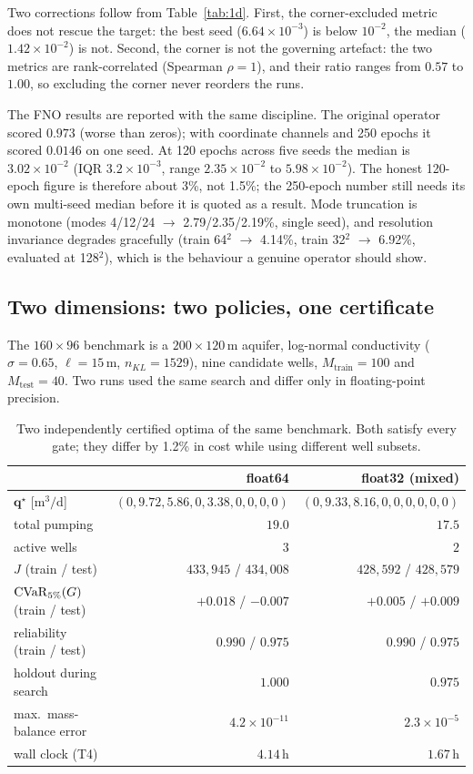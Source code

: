 Two corrections follow from Table~\ref{tab:1d}. First, the corner-excluded
metric does not rescue the target: the best seed
($6.64\times10^{-3}$) is below $10^{-2}$, the median ($1.42\times10^{-2}$) is
not. Second, the corner is not the governing artefact: the two metrics are
rank-correlated (Spearman $\rho=1$), and their ratio ranges from $0.57$ to
$1.00$, so excluding the corner never reorders the runs.

The FNO results are reported with the same discipline. The original operator
scored $0.973$ (worse than zeros); with coordinate channels and 250 epochs it
scored $0.0146$ on one seed. At 120 epochs across five seeds the median is
$3.02\times10^{-2}$ (IQR $3.2\times10^{-3}$, range $2.35\times10^{-2}$ to
$5.98\times10^{-2}$). The honest 120-epoch figure is therefore about 3\%, not
1.5\%; the 250-epoch number still needs its own multi-seed median before it is
quoted as a result. Mode truncation is monotone (modes 4/12/24 $\to$
2.79/2.35/2.19\%, single seed), and resolution invariance degrades gracefully
(train 64$^2$ $\to$ 4.14\%, train 32$^2$ $\to$ 6.92\%, evaluated at
128$^2$), which is the behaviour a genuine operator should show.

\subsection{Two dimensions: two policies, one certificate}
\label{sec:res2d}
\label{sec:res3dcert2d}

The $160\times96$ benchmark is a $200\times120$\,m aquifer, log-normal
conductivity ($\sigma=0.65$, $\ell=15$\,m, $n_{KL}=1529$), nine candidate wells,
$M_{\text{train}}=100$ and $M_{\text{test}}=40$. Two runs used the same search
and differ only in floating-point precision.

\begin{table}[htbp]
\centering
\small
\caption{Two independently certified optima of the same benchmark. Both satisfy
every gate; they differ by 1.2\% in cost while using different well subsets.}
\label{tab:2d}
\begin{tabular}{lrr}
\toprule
 & float64 & float32 (mixed) \\
\midrule
$\mathbf{q}^\star$ [$\mathrm{m^3/d}$] & $(0,9.72,5.86,0,3.38,0,0,0,0)$ & $(0,9.33,8.16,0,0,0,0,0,0)$ \\
total pumping & $19.0$ & $17.5$ \\
active wells & $3$ & $2$ \\
$J$ (train / test) & $433{,}945$ / $434{,}008$ & $428{,}592$ / $428{,}579$ \\
$\mathrm{CVaR}_{5\%}(G)$ (train / test) & $+0.018$ / $-0.007$ & $+0.005$ / $+0.009$ \\
reliability (train / test) & $0.990$ / $0.975$ & $0.990$ / $0.975$ \\
holdout during search & $1.000$ & $0.975$ \\
max.\ mass-balance error & $4.2\times10^{-11}$ & $2.3\times10^{-5}$ \\
wall clock (T4) & $4.14$\,h & $1.67$\,h \\
\bottomrule
\end{tabular}
\end{table}

